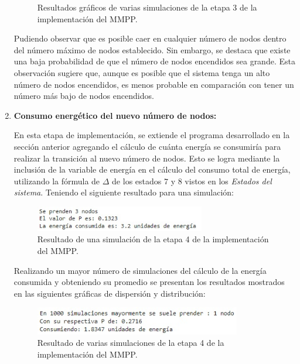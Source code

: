 \begin{enumerate}[label=\arabic*.]
\begin{figure}[H]
    \caption{Resultados gráficos de varias simulaciones de la etapa 3 de la implementación del MMPP.}
\end{figure}

Pudiendo observar que es posible caer en cualquier número de nodos dentro del número máximo de nodos establecido. Sin embargo, se destaca que existe una baja probabilidad de que el número de nodos encendidos sea grande. Esta observación sugiere que, aunque es posible que el sistema tenga un alto número de nodos encendidos, es menos probable en comparación con tener un número más bajo de nodos encendidos. 

\item \textbf{Consumo energético del nuevo número de nodos:}

En esta etapa de implementación, se extiende el programa desarrollado en la sección anterior agregando el cálculo de cuánta energía se consumiría para realizar la transición al nuevo número de nodos. Esto se logra mediante la inclusión de la variable de energía en el cálculo del consumo total de energía, utilizando la fórmula de $\Delta$ de los estados $7$ y $8$ vistos en los \textit{Estados del sistema}. Teniendo el siguiente resultado para una simulación:

\begin{figure}[H]
    \centering
    \includegraphics[width=0.7\textwidth]{imagenes/mmpp4.1.jpg}
    \caption{Resultado de una simulación de la etapa 4 de la implementación del MMPP.}
\end{figure}

Realizando un mayor número de simulaciones del cálculo de la energía consumida y obteniendo su promedio se presentan los resultados mostrados en las siguientes gráficas de dispersión y distribución:

\begin{figure}[H]
    \centering
    \includegraphics[width=0.85\textwidth]{imagenes/mmpp4.2.jpg}
    \caption{Resultado de varias simulaciones de la etapa 4 de la implementación del MMPP.}
\end{figure}
\newpage


\end{enumerate}

